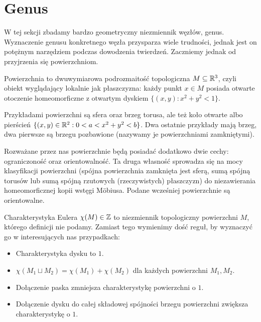\section{Genus} %
\label{sec:genus}
W tej sekcji zbadamy bardzo geometryczny niezmiennik węzłów, genus.
Wyznaczenie genusu konkretnego węzła przysparza wiele trudności, jednak jest on potężnym narzędziem podczas dowodzenia twierdzeń.
Zaczniemy jednak od przyjrzenia się powierzchniom.

\begin{definition} 
    Powierzchnia to dwuwymiarowa podrozmaitość topologiczna $M \subseteq \mathbb R^3$, czyli obiekt wyglądający lokalnie jak płaszczyzna: każdy punkt $x \in M$ posiada otwarte otoczenie homeomorficzne z otwartym dyskiem $\{(x,y) : x^2 + y^2 < 1\}$.
\end{definition}

Przykładami powierzchni są sfera oraz brzeg torusa, ale też koło otwarte albo pierścień $\{(x, y) \in \mathbb R^2 : 0 < a < x^2 + y^2 < b\}$.
Dwa ostatnie przykłady mają brzeg, dwa pierwsze są brzegu pozbawione (nazywamy je powierzchniami zamkniętymi).

Rozważane przez nas powierzchnie będą posiadać dodatkowo dwie cechy: ograniczoność oraz orientowalność.
Ta druga własność sprowadza się na mocy klasyfikacji powierzchni (spójna powierzchnia zamknięta jest sferą, sumą spójną torusów lub sumą spójną rzutowych (rzeczywistych) płaszczyzn) do niezawierania homeomorficznej kopii wstęgi Möbiusa.
Podane wcześniej powierzchnie są orientowalne.

\begin{definition} 
    Charakterystyka Eulera $\chi(M) \in \mathbb Z$ to niezmiennik
    topologiczny powierzchni $M$, którego definicji nie podamy.
    Zamiast tego wymienimy dość reguł,
    by wyznaczyć go w interesujących nas przypadkach:
    \begin{itemize}
        \item Charakterystyka dysku to $1$.
        \item $\chi(M_1 \sqcup M_2)=\chi(M_1) + \chi(M_2)$ dla każdych powierzchni $M_1, M_2$.
        \item Dołączenie paska zmniejsza charakterystykę powierzchni o $1$.
        \item Dołączenie dysku do całej składowej spójności brzegu powierzchni zwiększa charakterystykę o $1$.
    \end{itemize}
\end{definition}

